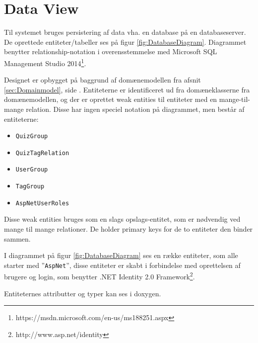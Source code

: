 \section{Data View}

Til systemet bruges persistering af data vha. en database på en databaseserver. De oprettede entiteter/tabeller ses på figur \ref{fig:DatabaseDiagram}. Diagrammet benytter relationship-notation i overensstemmelse med Microsoft SQL Management Studio 2014\footnote{https://msdn.microsoft.com/en-us/ms188251.aspx}.

Designet er opbygget på baggrund af domænemodellen fra afsnit \ref{sec:Domainmodel}, side \pageref{sec:Domainmodel}. Entiteterne er identificeret ud fra domæneklasserne fra domænemodellen, og der er oprettet weak entities til entiteter med en mange-til-mange relation. Disse har ingen speciel notation på diagrammet, men består af entiteterne:

\begin{itemize}
	\item\verb+QuizGroup+
	\item\verb+QuizTagRelation+
	\item\verb+UserGroup+
	\item\verb+TagGroup+
	\item\verb+AspNetUserRoles+
\end{itemize}

Disse weak entities bruges som en slags opslags-entitet, som er nødvendig ved mange til mange relationer. De holder primary keys for de to entiteter den binder sammen.

I diagrammet på figur \ref{fig:DatabaseDiagram} ses en række entiteter, som alle starter med ''\verb+AspNet+'', disse entiteter er skabt i forbindelse med oprettelsen af brugere og login, som benytter .NET Identity 2.0 Framework\footnote{http://www.asp.net/identity}.


Entiteternes attributter og typer kan ses i doxygen.
